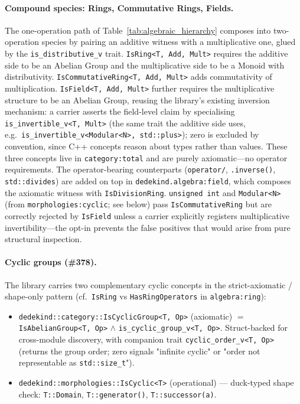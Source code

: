 \documentclass[11pt, a4paper]{report}
\begin{document}
\paragraph{Compound species: Rings, Commutative Rings, Fields.}
The one-operation path of Table~\ref{tab:algebraic_hierarchy} composes into two-operation species by pairing an additive witness with a multiplicative one, glued by the \texttt{is\_distributive\_v} trait. \texttt{IsRing<T, Add, Mult>} requires the additive side to be an Abelian Group and the multiplicative side to be a Monoid with distributivity. \texttt{IsCommutativeRing<T, Add, Mult>} adds commutativity of multiplication. \texttt{IsField<T, Add, Mult>} further requires the multiplicative structure to be an Abelian Group, reusing the library's existing inversion mechanism: a carrier asserts the field-level claim by specialising \texttt{is\_invertible\_v<T, Mult>} (the same trait the additive side uses, e.g.\ \texttt{is\_invertible\_v<Modular<N>, std::plus>}); zero is excluded by convention, since C++ concepts reason about types rather than values.
These three concepts live in \texttt{category:total} and are purely axiomatic---no operator requirements. The operator-bearing counterparts (\texttt{operator/}, \texttt{.inverse()}, \texttt{std::divides}) are added on top in \texttt{dedekind.algebra:field}, which composes the axiomatic witness with \texttt{IsDivisionRing}. \texttt{unsigned int} and \texttt{Modular<N>} (from \texttt{morphologies:cyclic}; see below) pass \texttt{IsCommutativeRing} but are correctly rejected by \texttt{IsField} unless a carrier explicitly registers multiplicative invertibility---the opt-in prevents the false positives that would arise from pure structural inspection.

\paragraph{Cyclic groups (\#378).}
The library carries two complementary cyclic concepts in the strict-axiomatic / shape-only pattern (cf.\ \texttt{IsRing} vs \texttt{HasRingOperators} in \texttt{algebra:ring}):

\begin{itemize}
  \item \texttt{dedekind::category::IsCyclicGroup<T, Op>} (axiomatic) $=$ \texttt{IsAbelianGroup<T, Op>} $\wedge$ \texttt{is\_cyclic\_group\_v<T, Op>}. Struct-backed for cross-module discovery, with companion trait \texttt{cyclic\_order\_v<T, Op>} (returns the group order; zero signals "infinite cyclic" or "order not representable as \texttt{std::size\_t}").
  \item \texttt{dedekind::morphologies::IsCyclic<T>} (operational) — duck-typed shape check: \texttt{T::Domain}, \texttt{T::generator()}, \texttt{T::successor(a)}.
\end{itemize}
\end{document}
